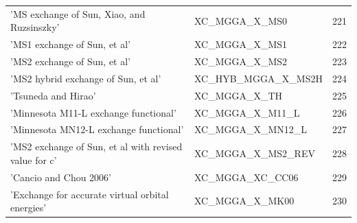 \documentclass[final,12pt]{article}
\begin{document}
{{{{{{\begin{table}[!h]
\begin{center}
\begin{tabular}{llr}
  'MS exchange of Sun, Xiao, and Ruzsinszky' & XC\_MGGA\_X\_MS0  &221\\
  'MS1 exchange of Sun, et al' & XC\_MGGA\_X\_MS1  &222\\
  'MS2 exchange of Sun, et al' & XC\_MGGA\_X\_MS2  &223\\
  'MS2 hybrid exchange of Sun, et al' & XC\_HYB\_MGGA\_X\_MS2H  &224\\
  'Tsuneda and Hirao' & XC\_MGGA\_X\_TH  &225\\
  'Minnesota M11-L exchange functional' & XC\_MGGA\_X\_M11\_L  &226\\
  'Minnesota MN12-L exchange functional' & XC\_MGGA\_X\_MN12\_L  &227\\
  'MS2 exchange of Sun, et al with revised value for c' & XC\_MGGA\_X\_MS2\_REV  &228\\
  'Cancio and Chou 2006' & XC\_MGGA\_XC\_CC06  &229\\
  'Exchange for accurate virtual orbital energies' & XC\_MGGA\_X\_MK00  &230\\
\end{tabular}
\end{center}
\end{table}

}}}}}}
\end{document}
